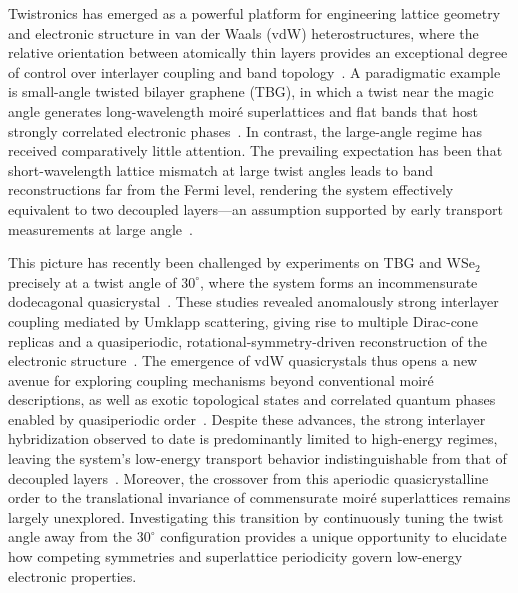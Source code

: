 \documentclass[reprint,
superscriptaddress,amsmath,amssymb,aps,prl]{revtex4-2}
\begin{document}
Twistronics has emerged as a powerful platform for engineering lattice geometry and electronic structure in van der Waals (vdW) heterostructures, where the relative orientation between atomically thin layers provides an exceptional degree of control over interlayer coupling and band topology~\cite{bistritzer2011moire, andrei2020graphene, yoo2019atomic}. A paradigmatic example is small-angle twisted bilayer graphene (TBG), in which a twist near the magic angle generates long-wavelength moir\'{e} superlattices and flat bands that host strongly correlated electronic phases~\cite{cao2018correlated, cao2018unconventional, yankowitz2019tuning, sharpe2019emergent, uri2023superconductivity}. In contrast, the large-angle regime has received comparatively little attention. The prevailing expectation has been that short-wavelength lattice mismatch at large twist angles leads to band reconstructions far from the Fermi level, rendering the system effectively equivalent to two decoupled layers---an assumption supported by early transport measurements at large angle~\cite{rickhaus2020electronic, pezzini202030, mrenca2022quantum, babich2025milli}.

This picture has recently been challenged by experiments on TBG and WSe$_2$ precisely at a twist angle of $30^\circ$, where the system forms an incommensurate dodecagonal quasicrystal~\cite{uri2023superconductivity,liu2025field}. These studies revealed anomalously strong interlayer coupling mediated by Umklapp scattering, giving rise to multiple Dirac-cone replicas and a quasiperiodic, rotational-symmetry-driven reconstruction of the electronic structure~\cite{ahn2018dirac, yao2018quasicrystalline, moon2019quasicrystalline, li2024tuning}. The emergence of vdW quasicrystals thus opens a new avenue for exploring coupling mechanisms beyond conventional moir\'{e} descriptions, as well as exotic topological states and correlated quantum phases enabled by quasiperiodic order~\cite{cao2020kohn, else2021quantum, koshino2022topological, liu2023high, tsang2024polar, ghadimi2025quasiperiodic}. Despite these advances, the strong interlayer hybridization observed to date is predominantly limited to high-energy regimes, leaving the system's low-energy transport behavior indistinguishable from that of decoupled layers~\cite{babich2025milli, pezzini202030}. Moreover, the crossover from this aperiodic quasicrystalline order to the translational invariance of commensurate moir\'{e} superlattices remains largely unexplored. Investigating this transition by continuously tuning the twist angle away from the $30^\circ$ configuration provides a unique opportunity to elucidate how competing symmetries and superlattice periodicity govern low-energy electronic properties.
\end{document}
